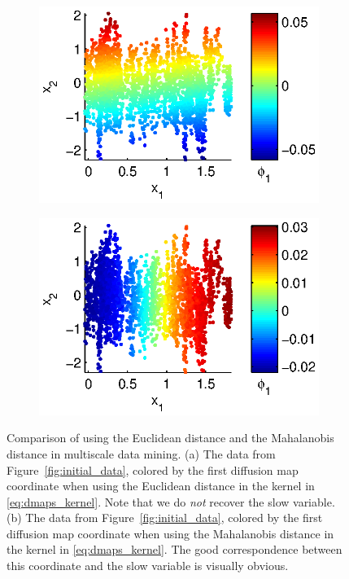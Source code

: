 \begin{figure}[t]
\centering
\begin{subfigure}{0.45\textwidth}
\centering
\includegraphics[width=\textwidth]{data_linear_DMAPS}
\caption{}
\end{subfigure}
\begin{subfigure}{0.45\textwidth}
\centering
\includegraphics[width=\textwidth]{data_linear_NIV}
\caption{}
\end{subfigure}
%
\caption[Comparison of using the Euclidean distance and the Mahalanobis distance in multiscale data mining]{Comparison of using the Euclidean distance and the Mahalanobis distance in multiscale data mining. (a) The data from Figure~\ref{fig:initial_data}, colored by the first diffusion map coordinate when using the Euclidean distance in the kernel in \eqref{eq:dmaps_kernel}. Note that we do {\em not} recover the slow variable. (b) The data from Figure~\ref{fig:initial_data}, colored by the first diffusion map coordinate when using the Mahalanobis distance in the kernel in \eqref{eq:dmaps_kernel}. The good correspondence between this coordinate and the slow variable is visually obvious.}
\label{fig:NIV_versus_DMAPS}
\end{figure}


